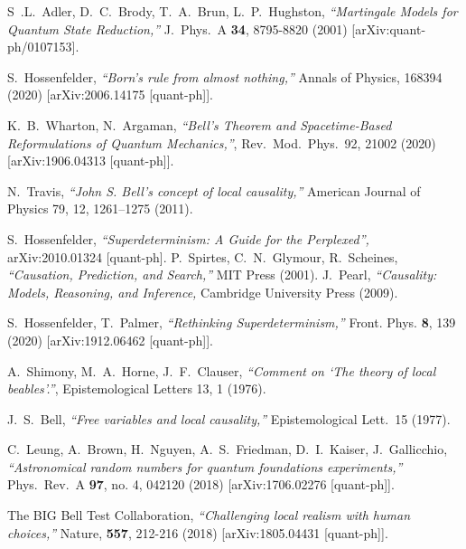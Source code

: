 \documentclass[11pt,twoside,A4]{article}
\begin{document}
\begin{thebibliography}{99}
{
S~.L.~Adler, D.~C.~Brody, T.~A.~Brun, L.~P.~Hughston, {\sl ``Martingale Models for Quantum State Reduction,''} J.\ Phys.\ A {\bf 34}, 8795-8820 (2001) [arXiv:quant-ph/0107153].
 
S.~Hossenfelder,
{\sl ``Born's rule from almost nothing,''} Annals of Physics, 168394 (2020)
[arXiv:2006.14175 [quant-ph]].

    K.~B.~Wharton, N.~Argaman, {\sl ``Bell's Theorem and Spacetime-Based Reformulations of Quantum Mechanics,''}, Rev.\ Mod.\ Phys.\ 92, 21002 (2020) [arXiv:1906.04313 [quant-ph]].

 N.~Travis,  {\sl ``John S. Bell’s concept of local causality,''} American Journal of Physics 79, 12, 1261--1275 (2011).



S.~Hossenfelder, {\sl ``Superdeterminism: A Guide for the Perplexed'',} arXiv:2010.01324 [quant-ph].
 P.~Spirtes, C.~N.~Glymour, R.~Scheines, {\sl ``Causation, Prediction, and Search,''} MIT Press (2001).
  J.~Pearl, {\sl ``Causality: Models, Reasoning, and Inference,} Cambridge University Press (2009).

S.~Hossenfelder, T.~Palmer,
{\sl ``Rethinking Superdeterminism,''}
Front. Phys. \textbf{8}, 139 (2020)
[arXiv:1912.06462 [quant-ph]].

 
A.~Shimony, M.~A.~Horne, J.~F.~Clauser, {\sl ``Comment on ‘The theory of
local beables’.''}, Epistemological Letters 13, 1 (1976). 

 J.~S.~Bell, {\sl ``Free variables and local causality,''} Epistemological Lett.\ 15 (1977). 
 
 
 
  C.~Leung, A.~Brown, H.~Nguyen, A.~S.~Friedman, D.~I.~Kaiser, J.~Gallicchio,
  {\sl ``Astronomical random numbers for quantum foundations experiments,''}
  Phys.\ Rev.\ A {\bf 97}, no. 4, 042120 (2018)
  [arXiv:1706.02276 [quant-ph]].
  
     The {\sc BIG} Bell Test Collaboration, {\sl ``Challenging local realism with human choices,''} Nature, {\bf 557}, 212-216 (2018) [arXiv:1805.04431 [quant-ph]].
  
}
\end{thebibliography}
\end{document}
